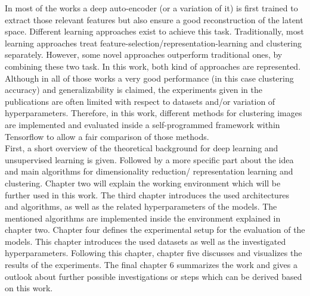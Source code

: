 \documentclass[12pt,DIV14,BCOR12mm,a4paper,footexclude,headinclude,halfparskip-,twoside,openright,openany,cleardoubleempty,idxtotoc,bibtotoc]{scrreprt} %
\numberwithin{equation}{chapter}
\begin{document}
In most of the works a deep auto-encoder (or a variation of it) is first trained to extract those relevant features but also ensure a good reconstruction of the latent space. Different learning approaches exist to achieve this task. Traditionally, most learning approaches treat feature-selection/representation-learning and clustering separately. However, some novel approaches outperform traditional ones, by combining these two task. In this work, both kind of approaches are represented. Although in all of those works a very good performance (in this case clustering accuracy) and generalizability is claimed, the experiments given in the publications are often limited with respect to datasets and/or variation of hyperparameters. Therefore, in this work, different methods for clustering images are implemented and evaluated inside a self-programmed framework within Tensorflow to allow a fair comparison of those methods.\\
First, a short overview of the theoretical background for deep learning and unsupervised learning is given. Followed by a more specific part about the idea and main algorithms for dimensionality reduction/ representation learning and clustering. Chapter two will explain the working environment which will be further used in this work. The third chapter introduces the used architectures and algorithms, as well as the related hyperparameters of the models. The mentioned algorithms are implemented inside the environment explained in chapter two. Chapter four defines the experimental setup for the evaluation of the models. This chapter introduces the used datasets as well as the investigated hyperparameters. Following this chapter, chapter five discusses and visualizes the results of the experiments. The final chapter 6 summarizes the work and gives a outlook about further possible investigations or steps which can be derived based on this work.
\end{document}
